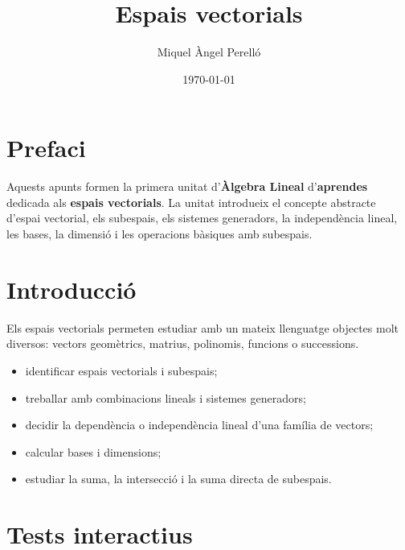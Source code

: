 \documentclass[12pt,a4paper,oneside]{book}
\begin{document}
\pagecolor{fons!20}
\frontmatter
\title{Espais vectorials}
\author{Miquel Àngel Perelló}
\date{\today}
\maketitle
\tableofcontents
\let\cleardoublepage\clearpage
\chapter*{Prefaci}
Aquests apunts formen la primera unitat d'\textbf{Àlgebra Lineal} d'\textbf{aprendes} dedicada als \textbf{espais vectorials}. La unitat introdueix el concepte abstracte d'espai vectorial, els subespais, els sistemes generadors, la independència lineal, les bases, la dimensió i les operacions bàsiques amb subespais.

\chapter{Introducció}
Els espais vectorials permeten estudiar amb un mateix llenguatge objectes molt diversos: vectors geomètrics, matrius, polinomis, funcions o successions.
\begin{itemize}
\item identificar espais vectorials i subespais;
\item treballar amb combinacions lineals i sistemes generadors;
\item decidir la dependència o independència lineal d'una família de vectors;
\item calcular bases i dimensions;
\item estudiar la suma, la intersecció i la suma directa de subespais.
\end{itemize}
\let\cleardoublepage\clearpage
\mainmatter






\chapter{Tests interactius}
\label{cap:tests}
\begin{Form}



\end{Form}
\backmatter
\end{document}
